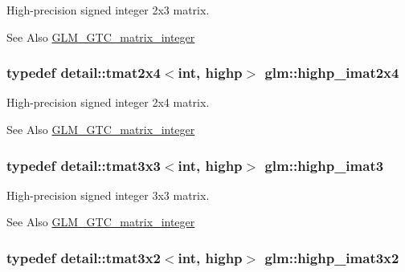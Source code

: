 High-\/precision signed integer 2x3 matrix. \begin{DoxySeeAlso}{See Also}
\hyperlink{group__gtc__matrix__integer}{G\-L\-M\-\_\-\-G\-T\-C\-\_\-matrix\-\_\-integer} 
\end{DoxySeeAlso}
\hypertarget{group__gtc__matrix__integer_ga84aec2e744ecac589fe8d502266e8efc}{
\subsubsection[{highp\-\_\-imat2x4}]{\setlength{\rightskip}{0pt plus 5cm}typedef detail\-::tmat2x4$<$int, highp$>$ {\bf glm\-::highp\-\_\-imat2x4}}}\label{group__gtc__matrix__integer_ga84aec2e744ecac589fe8d502266e8efc}
High-\/precision signed integer 2x4 matrix. \begin{DoxySeeAlso}{See Also}
\hyperlink{group__gtc__matrix__integer}{G\-L\-M\-\_\-\-G\-T\-C\-\_\-matrix\-\_\-integer} 
\end{DoxySeeAlso}
\hypertarget{group__gtc__matrix__integer_gaf12b3aa7e16a88b1fcf51be9a132048c}{
\subsubsection[{highp\-\_\-imat3}]{\setlength{\rightskip}{0pt plus 5cm}typedef detail\-::tmat3x3$<$int, highp$>$ {\bf glm\-::highp\-\_\-imat3}}}\label{group__gtc__matrix__integer_gaf12b3aa7e16a88b1fcf51be9a132048c}
High-\/precision signed integer 3x3 matrix. \begin{DoxySeeAlso}{See Also}
\hyperlink{group__gtc__matrix__integer}{G\-L\-M\-\_\-\-G\-T\-C\-\_\-matrix\-\_\-integer} 
\end{DoxySeeAlso}
\hypertarget{group__gtc__matrix__integer_ga9780c1bc052a34c59dc95f4dd9e1a5c8}{
\subsubsection[{highp\-\_\-imat3x2}]{\setlength{\rightskip}{0pt plus 5cm}typedef detail\-::tmat3x2$<$int, highp$>$ {\bf glm\-::highp\-\_\-imat3x2}}}\label{group__gtc__matrix__integer_ga9780c1bc052a34c59dc95f4dd9e1a5c8}
